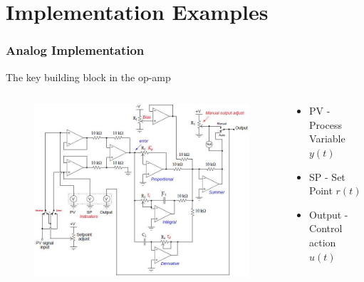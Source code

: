 \section{Implementation Examples}

\begin{frame}
	\frametitle{Analog Implementation}
	The key building block in the op-amp
	\begin{columns}
		\begin{column}{0.6\linewidth}
			\begin{figure}
				\centering
				\includegraphics[width=1.1\linewidth]{img/Principles_of_Feedback_Control_Fig_079}
			\end{figure}
		\end{column}
		\begin{column}{0.5\linewidth}
			\begin{itemize}
				\item PV - Process Variable $y(t)$
				\item SP - Set Point $r(t)$
				\item Output - Control action $u(t)$
			\end{itemize}
		\end{column}
	\end{columns}
\end{frame}

